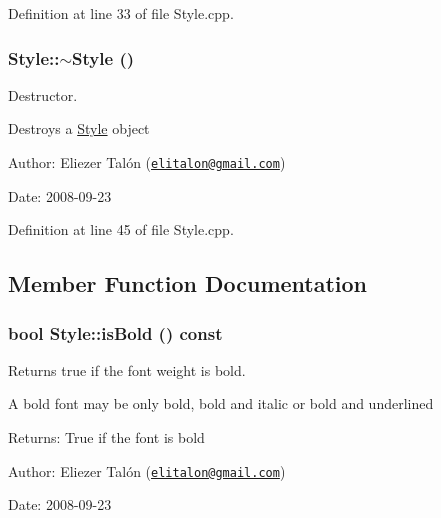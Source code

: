 Definition at line 33 of file Style.cpp.\hypertarget{class_style_7c798ef9b77bc94719542feade497725}{
\subsubsection[$\sim$Style]{\setlength{\rightskip}{0pt plus 5cm}Style::$\sim$Style ()}}
\label{class_style_7c798ef9b77bc94719542feade497725}


Destructor. 

Destroys a \hyperlink{class_style}{Style} object

\begin{Desc}
\item[Author:]Eliezer Talón (\href{mailto:elitalon@gmail.com}{\tt elitalon@gmail.com}) \end{Desc}
\begin{Desc}
\item[Date:]2008-09-23 \end{Desc}


Definition at line 45 of file Style.cpp.

\subsection{Member Function Documentation}
\hypertarget{class_style_59d23709575c5e6e5434ef0af5ff94b6}{
\subsubsection[isBold]{\setlength{\rightskip}{0pt plus 5cm}bool Style::isBold () const}}
\label{class_style_59d23709575c5e6e5434ef0af5ff94b6}


Returns true if the font weight is bold. 

A bold font may be only bold, bold and italic or bold and underlined

\begin{Desc}
\item[Returns:]True if the font is bold\end{Desc}
\begin{Desc}
\item[Author:]Eliezer Talón (\href{mailto:elitalon@gmail.com}{\tt elitalon@gmail.com}) \end{Desc}
\begin{Desc}
\item[Date:]2008-09-23 \end{Desc}


